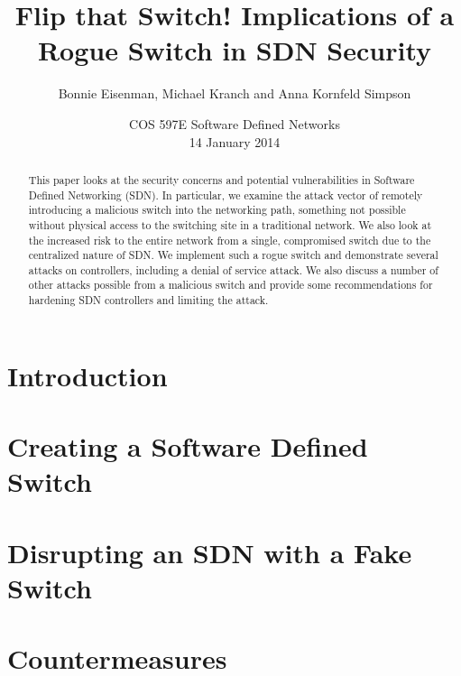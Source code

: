 \documentclass[12pt, letterpaper, twocolumn, twoside]{article}
\title{Flip that Switch! Implications of a Rogue Switch in SDN Security}
\author{Bonnie Eisenman, Michael Kranch and Anna Kornfeld Simpson}
\date{COS 597E Software Defined Networks \\ 14 January 2014}
\begin{document}
\maketitle

\begin{spacing}{1.0}

\begin{abstract}
This paper looks at the security concerns and potential vulnerabilities in Software Defined Networking (SDN). In particular, we examine the attack vector of remotely introducing a malicious switch into the networking path, something not possible without physical access to the switching site in a traditional network. We also look at the increased risk to the entire network from a single, compromised switch due to the centralized nature of SDN. We implement such a rogue switch and demonstrate several attacks on controllers, including a denial of service attack. We also discuss a number of other attacks possible from a malicious switch and provide some recommendations for hardening SDN controllers and limiting the attack.

\end{abstract}

\section{Introduction}


\section{Creating a Software Defined Switch}
\label{fake}


\section{Disrupting an SDN with a Fake Switch}
\label{attacks}


\section{Countermeasures}
\label{countermeasures}



\end{spacing}
\end{document}
